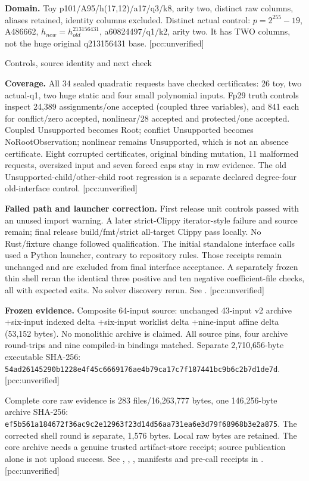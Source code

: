 \documentclass[10pt]{article}
\begin{document}
\textbf{Domain.} Toy p101/A95/h(17,12)/a17/q3/k8, arity two, distinct raw
columns, aliases retained, identity columns excluded. Distinct actual control:
$p=2^{255}-19$, A486662, $h_{new}=h_{old}^{213156431}$, a60824497/q1/k2, arity two.
It has TWO columns, not the huge original q213156431 base. [pcc:unverified]

\newpage
\begin{center}\Large Controls, source identity and next check\end{center}
\textbf{Coverage.} All 34 sealed quadratic requests have checked certificates:
26 toy, two actual-q1, two huge static and four small polynomial inputs.
Fp29 truth controls inspect 24,389 assignments/one accepted (coupled three
variables), and 841 each for conflict/zero accepted, nonlinear/28 accepted
and protected/one accepted. Coupled Unsupported becomes Root; conflict
Unsupported becomes NoRootObservation; nonlinear remains Unsupported, which
is not an absence certificate. Eight corrupted certificates, original binding
mutation, 11 malformed requests, oversized input and seven forced caps stay
in raw evidence. The old Unsupported-child/other-child root regression is a
separate declared degree-four old-interface control. [pcc:unverified]

\textbf{Failed path and launcher correction.} First release unit controls
passed with an unused import warning. A later strict-Clippy iterator-style
failure and source remain; final release build/fmt/strict all-target Clippy
pass locally. No Rust/fixture change followed qualification. The initial
standalone interface calls used a Python launcher, contrary to repository
rules. Those receipts remain unchanged and are excluded from final interface
acceptance. A separately frozen thin shell reran the identical three positive
and ten negative coefficient-file checks, all with expected exits. No solver
discovery rerun. See . [pcc:unverified]

\textbf{Frozen evidence.} Composite 64-input source: unchanged 43-input v2
archive +six-input indexed delta +six-input worklist delta +nine-input affine
delta (53,152 bytes). No monolithic archive is claimed. All source pins,
four archive round-trips and nine compiled-in bindings matched. Separate
2,710,656-byte executable SHA-256:\\
\texttt{54ad26145290b1228e4f45c6669176ae4b79ca17c7f187441bc9b6c2b7d1de7d}.
[pcc:unverified]

Complete core raw evidence is 283 files/16,263,777 bytes, one 146,256-byte
archive SHA-256:\\
\texttt{ef5b561a184672f36ac9c2e12963f23d14d56aa731ea6e3d79f68968b3e2a875}.
The corrected shell round is separate, 1,576 bytes. Local raw bytes are
retained. The core archive needs a genuine trusted artifact-store receipt;
source publication alone is not upload success. See ,
, , manifests and pre-call receipts in
. [pcc:unverified]
\end{document}
